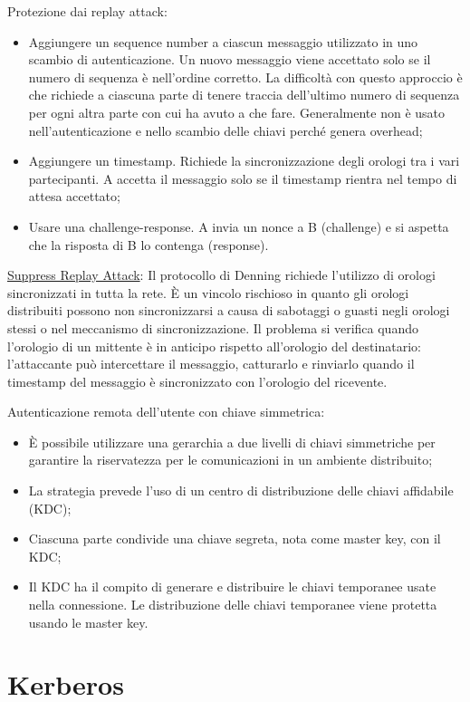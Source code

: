Protezione dai replay attack:
\begin{itemize}
    \item Aggiungere un sequence number a ciascun messaggio utilizzato in uno scambio di autenticazione. Un nuovo messaggio viene accettato solo se il numero di sequenza è nell'ordine corretto. La difficoltà con questo approccio è che richiede a ciascuna parte di tenere traccia dell'ultimo numero di sequenza per ogni altra parte con cui ha avuto a che fare. Generalmente non è usato nell'autenticazione e nello scambio delle chiavi perché genera overhead;
	\item Aggiungere un timestamp. Richiede la sincronizzazione degli orologi tra i vari partecipanti. A accetta il messaggio solo se il timestamp rientra nel tempo di attesa accettato;
	\item Usare una challenge-response. A invia un nonce a B (challenge) e si aspetta che la risposta di B lo contenga (response).
\end{itemize}

\underline{Suppress Replay Attack}: Il protocollo di Denning richiede l'utilizzo di orologi sincronizzati in tutta la rete. È un vincolo rischioso in quanto gli orologi distribuiti possono non sincronizzarsi a causa di sabotaggi o guasti negli orologi stessi o nel meccanismo di sincronizzazione. Il problema si verifica quando l'orologio di un mittente è in anticipo rispetto all'orologio del destinatario: l'attaccante può intercettare il messaggio, catturarlo e rinviarlo quando il timestamp del messaggio è sincronizzato con l'orologio del ricevente.

Autenticazione remota dell'utente con chiave simmetrica:
\begin{itemize}
    \item È possibile utilizzare una gerarchia a due livelli di chiavi simmetriche per garantire la riservatezza per le comunicazioni in un ambiente distribuito;
	\item La strategia prevede l'uso di un centro di distribuzione delle chiavi affidabile (KDC);
	\item Ciascuna parte condivide una chiave segreta, nota come master key, con il KDC;
	\item Il KDC ha il compito di generare e distribuire le chiavi temporanee usate nella connessione. Le distribuzione delle chiavi temporanee viene protetta usando le master key.
\end{itemize}

\section{Kerberos}

